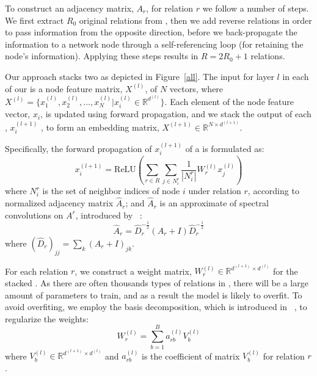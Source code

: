  To construct an adjacency matrix, $A_r$, for relation $r$ we follow a number of steps. We first extract $R_0$ original
 relations from \KGs, then we add reverse relations in order to pass information from the opposite direction, before we back-propagate the
 information to a network node through a self-referencing loop (for retaining the node's information). Applying these steps results in $R=2R_0+1$ relations. 	

 Our approach stacks two \RGCNs as depicted in Figure~\ref{all}.
 The input for layer $l$ in each of our \RGCNs is a node feature matrix, $X^{(l)}$, of $N$ vectors, where  $X^{(l)} =\{x^{(l)}_1,x^{(l)}_2,...,x^{(l)}_{N}
 |x^{(l)}_{i} \in \mathbb{R}^{d^{(l)}}\}$. Each element of the node feature vector, $x_i$, is updated using forward propagation, and we stack the output of each \RGCN, $x_i^{(l+1)}$
 , to form an embedding matrix, $X^{(l+1)} \in \mathbb{R}^{N \times d^{(l+1)}}$.

   Specifically, the forward propagation of $x_i^{(l+1)}$ of a \RGCN is formulated as:
	\begin{equation}
	x_i^{(l+1)}=\mathrm{ReLU} (\sum\limits_{r \in R}\sum\limits_{j \in N_i^r}\frac{1}{|N_i^r|}W_r^{(l)}x_j^{(l)})
	\end{equation}
%
%
where $N_i^r$ is the set of neighbor indices of node $i$ under relation $r$, according to normalized adjacency matrix $\hat A_r$; and $\hat
A_r$ is an approximate of spectral convolutions on $A^r$, introduced by ~\cite{Kipf2016Semi}:
	\begin{equation}
	\hat A_r=\hat D_r^{- \frac{1}{2}}(A_r+I)\hat D_r^{- \frac{1}{2}}
	\end{equation}
	where $(\hat D_r)_{jj}=\sum_k(A_r+I)_{jk}$.

	
	 For each relation $r$, we construct a weight matrix, $W_r^{(l)} \in \mathbb{R}^{d^{(l+1)}
\times d^{(l)}}$ for the stacked \RGCNs. As there are often thousands types of relations in \KGs, there will be a large amount of
parameters to train, and as a result the model is likely to overfit. To avoid overfiting, we employ the basis decomposition, which is
introduced in ~\cite{Schlichtkrull2017Modeling}, to regularize the weights:
	\begin{equation}
	W_r^{(l)}=\sum\limits_{b=1}^B a_{rb}^{(l)}V_b^{(l)}
	\end{equation}
	where $V_b^{(l)} \in \mathbb{R}^{d^{(l+1)} \times d^{(l)}}$ and $a_{rb}^{(l)}$ is the coefficient of matrix $V_b^{(l)}$ for relation $r$.

